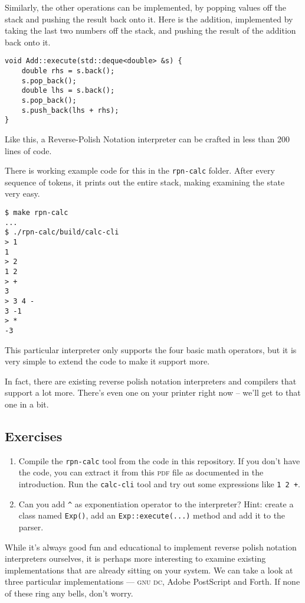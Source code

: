\documentclass[a4paper,twocolumn]{article}
\begin{document}
Similarly, the other operations can be implemented, by popping values off the stack and pushing the result back onto it. Here is the addition, implemented by taking the last two numbers off the stack, and pushing the result of the addition back onto it.

\begin{verbatim}
void Add::execute(std::deque<double> &s) {
    double rhs = s.back();
    s.pop_back();
    double lhs = s.back();
    s.pop_back();
    s.push_back(lhs + rhs);
}  
\end{verbatim}

Like this, a Reverse-Polish Notation interpreter can be crafted in less than 200 lines of code. 

There is working example code for this in the \verb|rpn-calc| folder. After every sequence of tokens, it prints out the entire stack, making examining the state very easy.

\begin{verbatim}
$ make rpn-calc
...
$ ./rpn-calc/build/calc-cli
> 1
1
> 2
1 2
> +
3
> 3 4 -
3 -1
> *
-3
\end{verbatim}
This particular interpreter only supports the four basic math operators, but it is very simple to extend the code to make it support more.

In fact, there are existing reverse polish notation interpreters and compilers that support a lot more. There's even one on your printer right now -- we'll get to that one in a bit.

\subsection*{Exercises}

\begin{enumerate}
  \item Compile the \verb|rpn-calc| tool from the code in this repository. If you don't have the code, you can extract it from this \textsc{pdf} file as documented in the introduction. Run the \verb|calc-cli| tool and try out some expressions like \verb|1 2 +|.

  \item Can you add \verb|^| as exponentiation operator to the interpreter? Hint: create a class named \verb|Exp()|, add an \verb|Exp::execute(...)| method and add it to the parser.
\end{enumerate}

While it's always good fun and educational to implement reverse polish notation interpreters ourselves, it is perhaps more interesting to examine existing implementations that are already sitting on your system. We can take a look at three particular implementations — \textsc{gnu dc}, Adobe PostScript and Forth. If none of these ring any bells, don't worry. 
\end{document}
